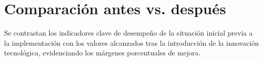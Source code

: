 \section{Comparación antes vs. después}
\label{sec:comparacion_antes_despues}

Se contrastan los indicadores clave de desempeño de la situación inicial previa a la implementación con los valores alcanzados tras la introducción de la innovación tecnológica, evidenciando los márgenes porcentuales de mejora.


